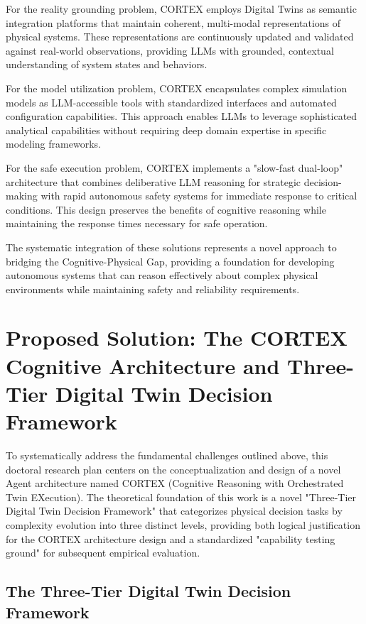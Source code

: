 For the reality grounding problem, CORTEX employs Digital Twins as semantic integration platforms that maintain coherent, multi-modal representations of physical systems. These representations are continuously updated and validated against real-world observations, providing LLMs with grounded, contextual understanding of system states and behaviors.

For the model utilization problem, CORTEX encapsulates complex simulation models as LLM-accessible tools with standardized interfaces and automated configuration capabilities. This approach enables LLMs to leverage sophisticated analytical capabilities without requiring deep domain expertise in specific modeling frameworks.

For the safe execution problem, CORTEX implements a "slow-fast dual-loop" architecture that combines deliberative LLM reasoning for strategic decision-making with rapid autonomous safety systems for immediate response to critical conditions. This design preserves the benefits of cognitive reasoning while maintaining the response times necessary for safe operation.

The systematic integration of these solutions represents a novel approach to bridging the Cognitive-Physical Gap, providing a foundation for developing autonomous systems that can reason effectively about complex physical environments while maintaining safety and reliability requirements.

\section{Proposed Solution: The CORTEX Cognitive Architecture and Three-Tier Digital Twin Decision Framework}

To systematically address the fundamental challenges outlined above, this doctoral research plan centers on the conceptualization and design of a novel Agent architecture named CORTEX (Cognitive Reasoning with Orchestrated Twin EXecution). The theoretical foundation of this work is a novel "Three-Tier Digital Twin Decision Framework" that categorizes physical decision tasks by complexity evolution into three distinct levels, providing both logical justification for the CORTEX architecture design and a standardized "capability testing ground" for subsequent empirical evaluation.

\subsection{The Three-Tier Digital Twin Decision Framework}

